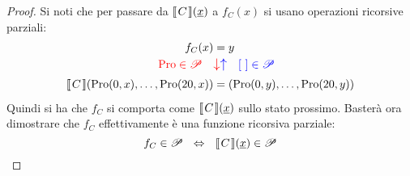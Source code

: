 \begin{proof}
    Si noti che per passare da $\opsemWHILE{C}{\sottolinea{x}}$ a $f_C(x)$ 
    si usano operazioni ricorsive parziali:
    $$\begin{aligned}
        f_C(x)&=y\\
        {\color{red}\Pro\in\ricPar}\quad &
        \mathlarger{{\color{red}\downarrow}{\color{blue}\uparrow}}
        \quad\color{blue}[\ ]\in\ricPar\\
        \opsemWHILE{C}{\Pro(0,x),\dots,\Pro(20,x)}&=(\Pro(0,y),\dots,\Pro(20,y))
    \end{aligned}$$
    Quindi si ha che $f_C$ si comporta come $\opsemWHILE{C}{\sottolinea{x}}$ sullo 
    stato prossimo. Basterà ora dimostrare che $f_C$ effettivamente è una funzione
    ricorsiva parziale:
    $$ f_C\in\ricPar \ \ \Leftrightarrow \ \ \opsemWHILE{C}{\sottolinea{x}}\in\ricPar$$


\end{proof}
